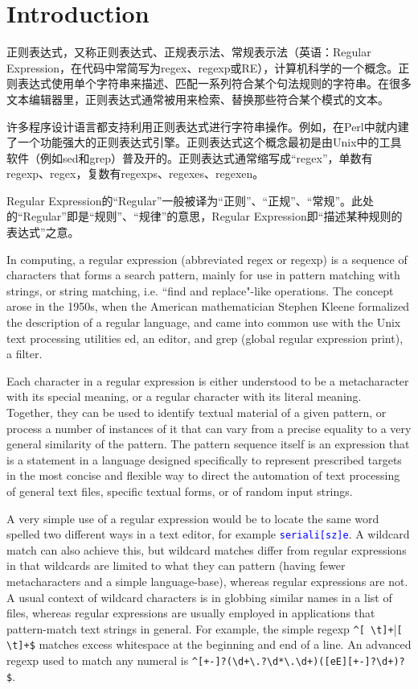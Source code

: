 \part{Introduction}


正则表达式，又称正则表达式、正规表示法、常规表示法（英语：Regular Expression，在代码中常简写为regex、regexp或RE），计算机科学的一个概念。正则表达式使用单个字符串来描述、匹配一系列符合某个句法规则的字符串。在很多文本编辑器里，正则表达式通常被用来检索、替换那些符合某个模式的文本。

许多程序设计语言都支持利用正则表达式进行字符串操作。例如，在Perl中就内建了一个功能强大的正则表达式引擎。正则表达式这个概念最初是由Unix中的工具软件（例如sed和grep）普及开的。正则表达式通常缩写成“regex”，单数有regexp、regex，复数有regexps、regexes、regexen。

Regular Expression的“Regular”一般被译为“正则”、“正规”、“常规”。此处的“Regular”即是“规则”、“规律”的意思，Regular Expression即“描述某种规则的表达式”之意。

In computing, a regular expression (abbreviated regex or regexp)\cite{regular_expression} is a sequence of characters that forms a search pattern, mainly for use in pattern matching with strings, or string matching, i.e. ``find and replace"-like operations. The concept arose in the 1950s, when the American mathematician Stephen Kleene formalized the description of a regular language, and came into common use with the Unix text processing utilities ed, an editor, and grep (global regular expression print), a filter.

Each character in a regular expression is either understood to be a metacharacter with its special meaning, or a regular character with its literal meaning. Together, they can be used to identify textual material of a given pattern, or process a number of instances of it that can vary from a precise equality to a very general similarity of the pattern. The pattern sequence itself is an expression that is a statement in a language designed specifically to represent prescribed targets in the most concise and flexible way to direct the automation of text processing of general text files, specific textual forms, or of random input strings.

A very simple use of a regular expression would be to locate the same word spelled two different ways in a text editor, for example \textcolor{Blue}{\texttt{seriali[sz]e}}. A wildcard match can also achieve this, but wildcard matches differ from regular expressions in that wildcards are limited to what they can pattern (having fewer metacharacters and a simple language-base), whereas regular expressions are not. A usual context of wildcard characters is in globbing similar names in a list of files, whereas regular expressions are usually employed in applications that pattern-match text strings in general. For example, the simple regexp \verb|^[ \t]+||\verb|[ \t]+$| matches excess whitespace at the beginning and end of a line. An advanced regexp used to match any numeral is \verb|^[+-]?(\d+\.?\d*|\verb|\.\d+)([eE][+-]?\d+)?$|.

